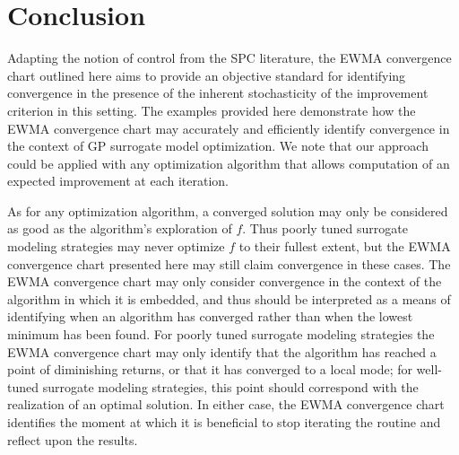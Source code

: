 \documentclass{article}
\begin{document}
%
%

%
%
\section{Conclusion}
%
%

%
Adapting the notion of control from the SPC literature, the EWMA convergence 
chart outlined here aims to provide an objective standard for identifying 
convergence in the presence of the inherent stochasticity of the improvement 
criterion in this setting. The examples provided here demonstrate how the EWMA 
convergence chart may accurately and efficiently identify convergence in the 
context of GP surrogate model optimization. We note that our approach could be 
applied with any optimization algorithm that allows computation of an expected 
improvement at each iteration.

%
%

As for any optimization algorithm, a converged solution may only be considered 
as good as the algorithm's exploration of $f$. Thus poorly tuned surrogate 
modeling strategies may never optimize $f$ to their fullest extent, but the 
EWMA convergence chart presented here may still claim convergence in these 
cases. The EWMA convergence chart may only consider convergence in the context 
of the algorithm in which it is embedded, and thus should be interpreted as a 
means of identifying when an algorithm has converged rather than when the 
lowest minimum has been found. For poorly tuned surrogate modeling strategies 
the EWMA convergence chart may only identify that the algorithm has reached a 
point of diminishing returns, or that it has converged to a local mode; for 
well-tuned surrogate modeling strategies, this point should correspond with 
the realization of an optimal solution. In either case, the EWMA convergence 
chart identifies the moment at which it is beneficial to stop iterating the 
routine and reflect upon the results.

\end{document}
